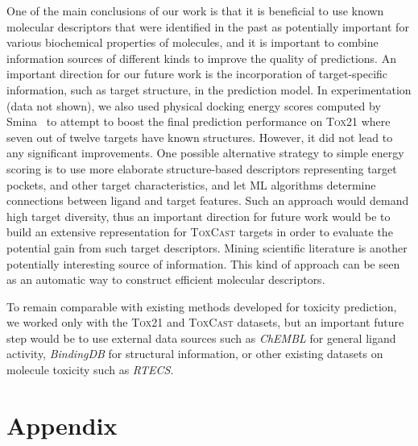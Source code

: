 \documentclass[11pt,a4paper]{article}
\begin{document}
One of the main conclusions of our work is that it is beneficial to use known
molecular descriptors that were identified in the past as potentially important
for various biochemical properties of molecules, and it is important to combine
information sources of different kinds to improve the quality of predictions. An 
important direction for our future work is the incorporation of target-specific
information, such as target structure, in the prediction model. 
In experimentation (data not shown), 
we also used physical docking energy scores
computed by Smina~\cite{Koes:2013aa} to attempt to 
boost the final prediction performance on \textsc{Tox21} where 
seven out of twelve targets have known structures. However, it did not lead
to any significant improvements. One possible alternative strategy to simple
energy scoring is to use 
more elaborate structure-based descriptors representing
target pockets, and other target characteristics, and let ML algorithms determine
connections between ligand and target features. Such an approach would demand
high target diversity, thus an important direction for future work would
be to build an extensive representation for \textsc{ToxCast} targets
in order to evaluate the potential gain from such target descriptors. 
Mining scientific literature is another potentially interesting source of information.
This kind of approach can be seen as an automatic way to construct efficient molecular descriptors. 

To remain comparable with existing methods developed for toxicity prediction, we worked
only with the \textsc{Tox21} and \textsc{ToxCast} datasets, 
but an important future step would be
to use external data sources 
such as \textit{ChEMBL} for general ligand activity, \textit{BindingDB} for
structural information, or other existing datasets on molecule toxicity such as
\textit{RTECS}. 

\clearpage
\appendix
\section{Appendix}
\setcounter{table}{0}
\renewcommand{\thetable}{A.\arabic{table}}
\end{document}
